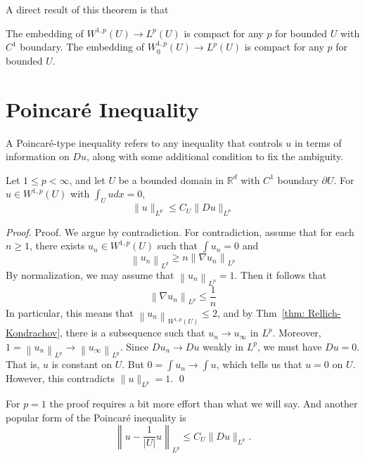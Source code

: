 A direct result of this theorem is that 
\begin{corollary}
\label{thm: Compactness of W1p to Lp}
The embedding of $W^{1, p}(U) \rightarrow L^{p}(U)$ is compact for any $p$ for bounded $U$ with $C^{1}$ boundary. The embedding of $W_{0}^{1, p}(U) \rightarrow L^{p}(U)$ is compact for any $p$ for bounded $U$.
\end{corollary}

\newpage 
\section{Poincar\'e Inequality}
A Poincar\'e-type inequality refers to any inequality that controls $u$ in terms of information on $D u$, along with some additional condition to fix the ambiguity.
\begin{theorem}
\label{thm: Poincare inequality}
Let $1 \leq p<\infty$, and let $U$ be a bounded domain in $\mathbb{R}^{d}$ with $C^{1}$ boundary $\partial U$. For $u \in W^{1, p}(U)$ with $\int_{U} u d x=0$,
$$
\|u\|_{L^{p}} \leq C_{U}\|D u\|_{L^{p}}
$$
\end{theorem}
\begin{proof}
    Proof. We argue by contradiction. For contradiction, assume that for each $n \geq 1$, there exists $u_{n} \in W^{1, p}(U)$ such that $\int u_{n}=0$ and
    $$
    \left\|u_{n}\right\|_{L^{p}} \geq n\left\|\nabla u_{n}\right\|_{L^{p}}
    $$
    By normalization, we may assume that $\left\|u_{n}\right\|_{L^{p}}=1$. Then it follows that
    $$
    \left\|\nabla u_{n}\right\|_{L^{p}} \leq \frac{1}{n}
    $$
    In particular, this means that $\left\|u_{n}\right\|_{W^{1, p}(U)} \leq 2$, and by Thm~\ref{thm: Rellich-Kondrachov}, there is a subsequence such that $u_{n} \rightarrow u_{\infty}$ in $L^{p}$. Moreover, $1=\left\|u_{n}\right\|_{L^{p}} \rightarrow\left\|u_{\infty}\right\|_{L^{p}}$. Since $D u_{n} \rightarrow D u$ weakly in $L^{p}$, we must have $D u=0$. That is, $u$ is constant on $U$. But $0=\int u_{n} \rightarrow \int u$, which tells us that $u=0$ on $U$. However, this contradicts $\|u\|_{L^{p}}=1$.
    \qed
\end{proof}
\begin{remark}
For $p=1$ the proof requires a bit more effort than what we will say. And another popular form of the Poincar\'e inequality is
$$
\left\|u-\frac{1}{|U|} u\right\|_{L^{p}} \leq C_{U}\|D u\|_{L^{p}} .
$$
\end{remark}

